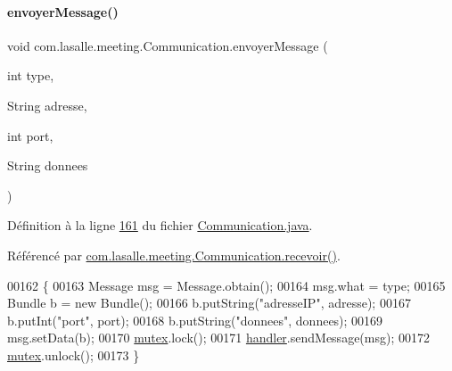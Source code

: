\mbox{\label{classcom_1_1lasalle_1_1meeting_1_1_communication_a7fa206969cf5dc48f4660845bbff0fc1}} 
\paragraph{\texorpdfstring{envoyer\+Message()}{envoyerMessage()}}
{\footnotesize\ttfamily void com.\+lasalle.\+meeting.\+Communication.\+envoyer\+Message (\begin{DoxyParamCaption}\item[{int}]{type,  }\item[{String}]{adresse,  }\item[{int}]{port,  }\item[{String}]{donnees }\end{DoxyParamCaption})\hspace{0.3cm}{\ttfamily [private]}}



Définition à la ligne \hyperlink{_communication_8java_source_l00161}{161} du fichier \hyperlink{_communication_8java_source}{Communication.\+java}.



Référencé par \hyperlink{_communication_8java_source_l00132}{com.\+lasalle.\+meeting.\+Communication.\+recevoir()}.


\begin{DoxyCode}
00162     \{
00163         Message msg = Message.obtain();
00164         msg.what = type;
00165         Bundle b = \textcolor{keyword}{new} Bundle();
00166         b.putString(\textcolor{stringliteral}{"adresseIP"}, adresse);
00167         b.putInt(\textcolor{stringliteral}{"port"}, port);
00168         b.putString(\textcolor{stringliteral}{"donnees"}, donnees);
00169         msg.setData(b);
00170         \hyperlink{classcom_1_1lasalle_1_1meeting_1_1_communication_af123afba8dcddc259017fb5c3b431dab}{mutex}.lock();
00171         \hyperlink{classcom_1_1lasalle_1_1meeting_1_1_communication_a05fa5f360f28819a9e106e0265a74643}{handler}.sendMessage(msg);
00172         \hyperlink{classcom_1_1lasalle_1_1meeting_1_1_communication_af123afba8dcddc259017fb5c3b431dab}{mutex}.unlock();
00173     \}
\end{DoxyCode}
\mbox{\label{classcom_1_1lasalle_1_1meeting_1_1_communication_a3b07023cb3f3a1549da711b5c6ba6af1}} 
